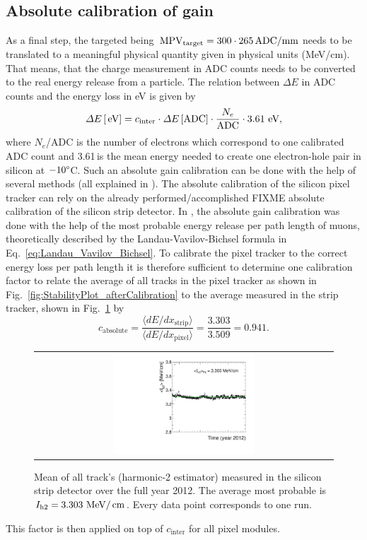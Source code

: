 \subsection*{Absolute calibration of gain}
As a final step, the targeted \mpv being $\,\text{MPV}_{\text{target}}=300 \cdot 265 \,  \text{ADC/mm}$ needs to be translated to a meaningful physical quantity given in physical units (\eg MeV/cm).
That means, that the charge measurement in ADC counts needs to be converted to the real energy release from a particle.
The relation between $\Delta E$ in ADC counts and the energy loss in eV is given by
\begin{equation}
\Delta E\,[\,\text{e}\kern-0.06667em\text{V}] = c_{\text{inter}} \cdot \Delta E\,[\text{ADC}] \cdot \frac{N_e}{\text{ADC}} \cdot 3.61 \, \,\text{e}\kern-0.06667em\text{V},
\end{equation}
where $N_e$/ADC is the number of electrons which correspond to one calibrated ADC count and 3.61\,\ev is the  mean energy needed to create one electron-hole pair in silicon at $-10\degree$C.
Such an absolute gain calibration can be done with the help of several methods (all explained in \cite{bib:Quertenmont_2010}).
The absolute calibration of the silicon pixel tracker can rely on the already performed/accomplished FIXME  absolute calibration of the silicon strip detector.
In \cite{bib:Quertenmont_2010}, the absolute gain calibration was done with the help of the most probable energy release per path length of muons, 
theoretically described by the Landau-Vavilov-Bichsel formula in Eq.~\eqref{eq:Landau_Vavilov_Bichsel}.  
To calibrate the pixel tracker to the correct energy loss per path length it is therefore sufficient to determine one calibration factor to relate the average \dedx of all tracks in the pixel tracker as shown in 
Fig.~\ref{fig:StabilityPlot_afterCalibration} to the average measured \dedx in the strip tracker, shown in Fig.~\ref{fig:StabilityPlot_Strip} by
\begin{equation}
c_{\text{absolute}} = \frac{\langle dE/dx_{\text{strip}} \rangle}{\langle dE/dx_{\text{pixel}} \rangle} = \frac{3.303}{3.509} = 0.941.
\end{equation}
\begin{figure}[!t]
  \centering 
  \begin{tabular}{c}
  \includegraphics[width=0.49\textwidth]{figures/analysis/PixelCalibration/StabilityPlot_Strip_afterCalibration_withoutStepFits_NEW.pdf}
  \end{tabular}
  \caption{Mean of all track's \dedx (harmonic-2 estimator) measured in the silicon strip detector over the full year 2012. The average most probable \dedx is $I_{\text{h2}}=3.303\,\,\text{Me}\kern-0.06667em\text{V}/\,\text{cm}$. Every data point corresponds to one run.} 
  \label{fig:StabilityPlot_Strip}
\end{figure}
This factor is then applied on top of $c_{\text{inter}}$ for all pixel modules.

